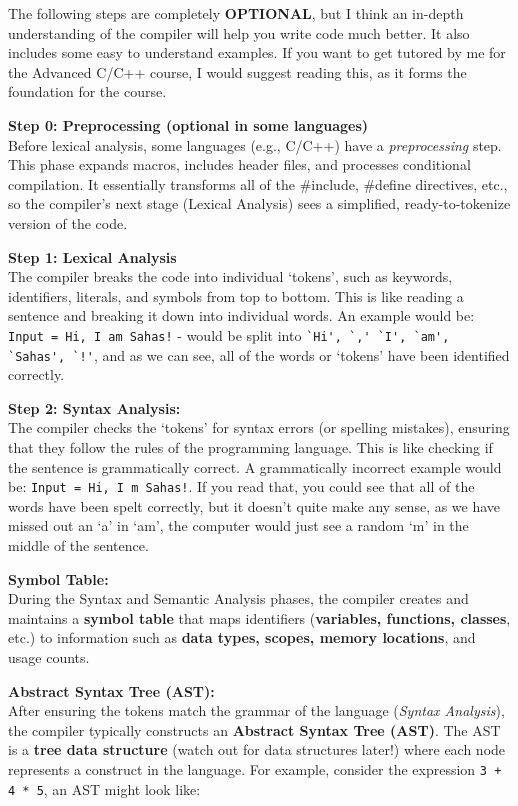 \documentclass[a4paper,12pt]{article}
\begin{document}
\begin{center}
    The following steps are completely \textbf{OPTIONAL}, but I think an in-depth understanding of the compiler will help you write code much better. It also includes some easy to understand examples. If you want to get tutored by me for the Advanced C/C++ course, I would suggest reading this, as it forms the foundation for the course.
\end{center}

\textbf{Step 0: Preprocessing (optional in some languages)}\\
Before lexical analysis, some languages (e.g., C/C++) have a \textit{preprocessing} step.
This phase expands macros, includes header files, and processes conditional compilation.
It essentially transforms all of the \#include, \#define directives, etc., so the compiler’s next stage (Lexical Analysis) sees a simplified, ready-to-tokenize version of the code.

\textbf{Step 1: Lexical Analysis}\\ The compiler breaks the code into individual `tokens', such as keywords, identifiers, literals, and symbols from top to bottom. This is like reading a sentence and breaking it down into individual words. An example would be: \verb|Input = Hi, I am Sahas!| - would be split into \verb|`Hi', `,' `I', `am', `Sahas', `!'|, and as we can see, all of the words or `tokens' have been identified correctly.

\textbf{Step 2: Syntax Analysis:}\\ The compiler checks the `tokens' for syntax errors (or spelling mistakes), ensuring that they follow the rules of the programming language. This is like checking if the sentence is grammatically correct. A grammatically incorrect example would be: \verb|Input = Hi, I m Sahas!|. If you read that, you could see that all of the words have been spelt correctly, but it doesn't quite make any sense, as we have missed out an `a' in `am', the computer would just see a random `m' in the middle of the sentence.

\textbf{Symbol Table:}\\
During the Syntax and Semantic Analysis phases, the compiler creates and maintains a 
\textbf{symbol table} that maps identifiers (\textbf{variables, functions, classes}, etc.) to information such as \textbf{data types, scopes, memory locations}, and usage counts.

\textbf{Abstract Syntax Tree (AST):}\\
After ensuring the tokens match the grammar of the language (\textit{Syntax Analysis}),
the compiler typically constructs an \textbf{Abstract Syntax Tree (AST)}. The AST is a 
\textbf{tree data structure} (watch out for data structures later!) where each node represents a construct in the language. For example, consider the expression \verb|3 + 4 * 5|, an AST might look like:
\end{document}
